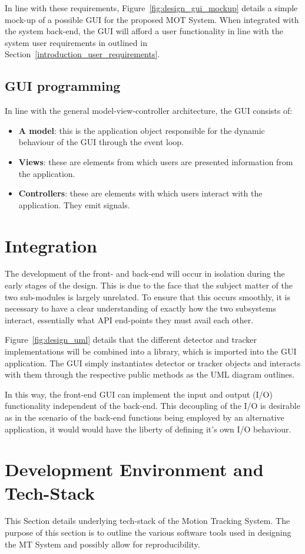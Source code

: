 In line with these requirements, Figure~\ref{fig:design_gui_mockup} details a
simple mock-up of a possible GUI for the proposed MOT System. When integrated
with the system back-end, the GUI will afford a user functionality in
line with the system user requirements in outlined in
Section~\ref{introduction_user_requirements}.


\subsection{GUI programming}

In line with the general model-view-controller architecture, the GUI consists
of:
\begin{itemize}
    \item \textbf{A model}: this is the application object responsible for the
        dynamic behaviour of the GUI through the event loop.
    \item \textbf{Views}: these are elements from which users are presented
        information from the application. 
    \item \textbf{Controllers}: these are elements with which users interact with
        the application. They emit signals.
\end{itemize}


\section{Integration}
The development of the front- and back-end will occur in isolation during the
early stages of the design. This is due to the face that the subject matter of
the two sub-modules is largely unrelated. To ensure that this occurs smoothly,
it is necessary to have a clear understanding of exactly how the two subsystems
interact, essentially what API end-points they must avail each other.

Figure~\ref{fig:design_uml} details that the different detector and tracker
implementations will be combined into a library, which is imported into the GUI
application.
The GUI simply instantiates detector or tracker objects and interacts with them
through the respective public methods as the UML diagram outlines.

In this way, the front-end GUI can implement the input and output (I/O) functionality
independent of the back-end. This decoupling of the I/O is desirable as in the
scenario of the back-end functions being employed by an alternative application,
it would would have the liberty of defining it's own I/O behaviour. 

\section{Development Environment and Tech-Stack}
This Section details underlying tech-stack of the Motion Tracking System. The
purpose of this section is to outline the various software tools used in
designing the MT System and possibly allow for reproducibility.



